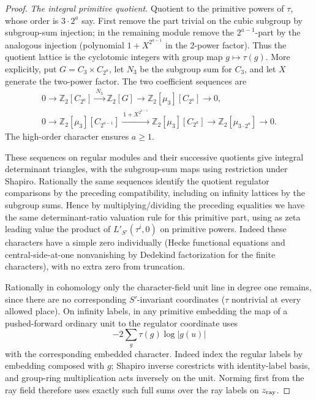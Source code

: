 \begin{proof}
\par\smallskip
\emph{The integral primitive quotient.}  Quotient to the primitive powers of
\(\tau\), whose order is \(3\cdot2^a\) say. First remove the part trivial on
the cubic subgroup by subgroup-sum injection; in the remaining module remove
the \(2^{a-1}\)-part by the analogous injection (polynomial \(1+X^{2^{a-1}}\)
in the 2-power factor). Thus the quotient lattice is the cyclotomic integers
with group map
\(g\mapsto\tau(g)\).  More explicitly, put
\(G=C_3\times C_{2^a}\), let \(N_3\) be the subgroup sum for
\(C_3\), and let \(X\) generate the two-power factor.  The two
coefficient sequences are
\[
\begin{gathered}
0\longrightarrow\mathbb Z_2[C_{2^a}]
 \xrightarrow{\ N_3\ }\mathbb Z_2[G]
 \longrightarrow\mathbb Z_2[\mu_3][C_{2^a}]
 \longrightarrow0,\\
0\longrightarrow\mathbb Z_2[\mu_3][C_{2^{a-1}}]
 \xrightarrow{\ 1+X^{2^{a-1}}\ }
 \mathbb Z_2[\mu_3][C_{2^a}]
 \longrightarrow\mathbb Z_2[\mu_{3\cdot2^a}]
 \longrightarrow0.
\end{gathered}
\]
The high-order character ensures \(a\ge1\). 

These sequences on regular modules and their successive quotients give
integral determinant triangles, with the subgroup-sum maps using restriction
under Shapiro. Rationally the same sequences identify the quotient regulator
comparisons by the preceding compatibility, including on infinity lattices by
the subgroup sums. Hence by multiplying/dividing the preceding equalities we
have the same determinant-ratio valuation rule for this primitive part, using
as zeta leading value the product of \(L'_{S'}(\tau^i,0)\) on primitive
powers. Indeed these characters have a simple zero individually (Hecke
functional equations and central-side-at-one nonvanishing by Dedekind
factorization for the finite characters), with no extra zero from truncation.

Rationally in cohomology only the character-field unit line in degree one
remains, since there are no corresponding \(S'\)-invariant coordinates
(\(\tau\) nontrivial at every allowed place). On infinity labels, in any
primitive embedding the map of a pushed-forward ordinary unit to the regulator
coordinate uses
\[
                                -2\sum_g\tau(g)\log|g(u)|
\]
with the corresponding embedded character. Indeed index the regular labels by
embedding composed with \(g\); Shapiro inverse corestricts with identity-label
basis, and group-ring multiplication acts inversely on the unit. Norming first
from the ray field therefore uses exactly such full sums over the ray labels
on \(z_{\rm ray}\).


\end{proof}

